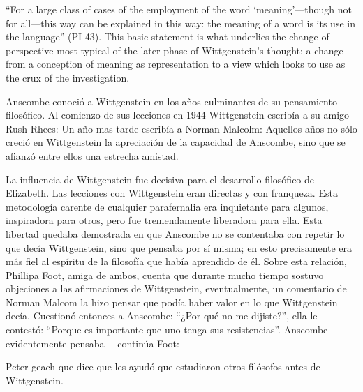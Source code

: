 \begin{revision}
   ``For a large class of cases of the employment of the word ‘meaning’—though not
   for all—this way can be explained in this way: the meaning of a word is its use
   in the language'' (PI 43). This basic statement is what underlies the change of
   perspective most typical of the later phase of Wittgenstein's thought: a change
   from a conception of meaning as representation to a view which looks to use as
   the crux of the investigation. 
   \end{revision}

Anscombe conoció a Wittgenstein en los años culminantes de su pensamiento
     filosófico. 
     Al comienzo de sus lecciones en 1944 Wittgenstein escribía a su amigo Rush Rhees:
     Un año mas tarde escribía a Norman Malcolm:
     Aquellos años no sólo creció en Wittgenstein la apreciación de la capacidad de
     Anscombe, sino que se afianzó entre ellos una estrecha amistad. 

     La influencia de Wittgenstein fue decisiva para el desarrollo filosófico de
     Elizabeth. Las lecciones con Wittgenstein eran directas y con franqueza. Esta
     metodología carente de cualquier parafernalia era inquietante para algunos,
     inspiradora para otros, pero fue tremendamente liberadora para
     ella.\autocite[loc 9853 Chapter 4, Section 24, \S5]{monk} Esta libertad
     quedaba demostrada en que Anscombe no se contentaba con repetir lo que decía
     Wittgenstein, sino que pensaba por sí misma; en esto precisamente era más fiel
     al espíritu de la filosofía que había aprendido de él. Sobre esta relación,
     Phillipa Foot, amiga de ambos, cuenta que durante mucho tiempo sostuvo
     objeciones a las afirmaciones de Wittgenstein, eventualmente, un comentario de
     Norman Malcom la hizo pensar que podía haber valor en lo que Wittgenstein decía.
     Cuestionó entonces a Anscombe: 
     ``¿Por qué no me dijiste?'', ella le contestó: ``Porque es importante que uno
     tenga sus resistencias''. Anscombe evidentemente pensaba ---continúa Foot: 

     Peter geach que dice que les ayudó que estudiaron otros filósofos antes de
     Wittgenstein.


